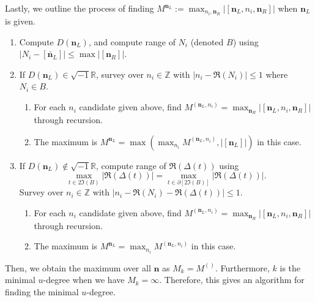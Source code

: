 \documentclass{article}
\theoremstyle{definition}
\theoremstyle{plain}
\theoremstyle{remark}
\numberwithin{equation}{section}
\newcommand{\bZ}{\mathbb{Z}}
\newcommand{\bR}{\mathbb{R}}
\newcommand{\abs}[1]{\left| {#1} \right|}
\newcommand{\im}{{\sqrt{-1}}}
\def\ns{{\mathbf{n}}}
\def\nsL{{\mathbf{n}_L}}
\def\nsR{{\mathbf{n}_R}}
\begin{document}
Lastly, we outline the process of finding $M^{\nsL} := \max_{n_i, \nsR} \abs{[\nsL, n_i, \nsR]}$ when $\nsL$ is given.
\begin{enumerate}
  \item Compute $D(\nsL)$, and compute range of $N_i$ (denoted $B$)
        using $\abs{N_i - [\overleftarrow{\nsL}]} \leq \max \abs{[\nsR]}$.
  \item If $D(\nsL) \in \im \bR$, survey over $n_i \in \bZ$ with $\abs{n_i - \Re(N_i)} \leq 1$ where $N_i \in B$.
  \begin{enumerate}
    \item For each $n_i$ candidate given above, find $M^{(\nsL, n_i)} = \max_{\nsR} \abs{[\nsL, n_i, \nsR]}$ through recursion.
    \item The maximum is $M^{\nsL} = \max( \max_{n_i} M^{(\nsL, n_i)}, \abs{[\nsL]} )$ in this case.
  \end{enumerate}
  \item If $D(\nsL) \notin \im \bR$, compute range of $\Re(\Delta(t))$ using
        \[ \max_{t \in 2 \Im(B)} \abs{\Re(\Delta(t))} = \max_{t \in \partial [2 \Im(B)]} \abs{\Re(\Delta(t))}. \]
        Survey over $n_i \in \bZ$ with $\abs{n_i - \Re(N_i) - \Re(\Delta(t))} \leq 1$.
  \begin{enumerate}
    \item For each $n_i$ candidate given above, find $M^{(\nsL, n_i)} = \max_{\nsR} \abs{[\nsL, n_i, \nsR]}$ through recursion.
    \item The maximum is $M^{\nsL} = \max_{n_i} M^{(\nsL, n_i)}$ in this case.
  \end{enumerate}
\end{enumerate}

Then, we obtain the maximum over all $\ns$ as $M_k = M^{()}$.
Furthermore, $k$ is the minimal $u$-degree when we have $M_k = \infty$.
Therefore, this gives an algorithm for finding the minimal $u$-degree.
\end{document}
